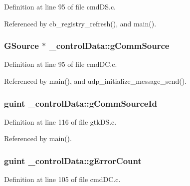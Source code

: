 Definition at line 95 of file cmd\+D\+S.\+c.



Referenced by cb\+\_\+registry\+\_\+refresh(), and main().

\hypertarget{struct__control_data_abfbd9e642ba240fa5985f63d60886de4}{}
\subsubsection[{g\+Comm\+Source}]{\setlength{\rightskip}{0pt plus 5cm}G\+Source $\ast$ \+\_\+control\+Data\+::g\+Comm\+Source}\label{struct__control_data_abfbd9e642ba240fa5985f63d60886de4}


Definition at line 95 of file cmd\+D\+C.\+c.



Referenced by main(), and udp\+\_\+initialize\+\_\+message\+\_\+send().

\hypertarget{struct__control_data_a599cefa2edf28b0cf58f9180a3be0a19}{}
\subsubsection[{g\+Comm\+Source\+Id}]{\setlength{\rightskip}{0pt plus 5cm}guint \+\_\+control\+Data\+::g\+Comm\+Source\+Id}\label{struct__control_data_a599cefa2edf28b0cf58f9180a3be0a19}


Definition at line 116 of file gtk\+D\+S.\+c.



Referenced by main().

\hypertarget{struct__control_data_a0dcc9f369186f6cf7c99b2178be66e58}{}
\subsubsection[{g\+Error\+Count}]{\setlength{\rightskip}{0pt plus 5cm}guint \+\_\+control\+Data\+::g\+Error\+Count}\label{struct__control_data_a0dcc9f369186f6cf7c99b2178be66e58}


Definition at line 105 of file cmd\+D\+C.\+c.



